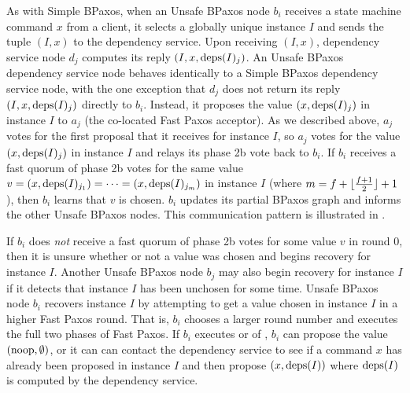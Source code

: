 As with Simple BPaxos, when an Unsafe BPaxos node $b_i$ receives a state
machine command $x$ from a client, it selects a globally unique instance $I$
and sends the tuple $(I, x)$ to the dependency service. Upon receiving $(I,
x)$, dependency service node $d_j$ computes its reply $(I, x, \text{deps}(I)_j)$.  An
Unsafe BPaxos dependency service node behaves identically to a Simple BPaxos
dependency service node, with the one exception that $d_j$ does not return its
reply $(I, x, \text{deps}(I)_j)$ directly to $b_i$. Instead, it proposes the value
$(x, \text{deps}(I)_j)$ in instance $I$ to $a_j$ (the co-located Fast Paxos
acceptor). As we described above, $a_j$ votes for the first proposal that it
receives for instance $I$, so $a_j$ votes for the value $(x, \text{deps}(I)_j)$ in
instance $I$ and relays its phase 2b vote back to $b_i$.
%
If $b_i$ receives a fast quorum of phase 2b votes for the same value $v = (x,
\text{deps}(I)_{j_1}) = \cdots = (x, \text{deps}(I)_{j_m})$ in instance $I$ (where $m =
f + \lfloor\frac{f + 1}{2}\rfloor + 1$), then $b_i$ learns that $v$ is chosen. $b_i$ updates its
partial BPaxos graph and informs the other Unsafe BPaxos nodes. This
communication pattern is illustrated in .

{}
{}

If $b_i$ does \emph{not} receive a fast quorum of phase 2b votes for some value
$v$ in round 0, then it is unsure whether or not a value was chosen and begins
recovery for instance $I$. Another Unsafe BPaxos node $b_j$ may also begin
recovery for instance $I$ if it detects that instance $I$ has been unchosen for
some time.
%
Unsafe BPaxos node $b_i$ recovers instance $I$ by attempting to get a value
chosen in instance $I$ in a higher Fast Paxos round. That is, $b_i$ chooses a
larger round number and executes the full two phases of Fast Paxos. If $b_i$
executes  or  of
, $b_i$ can propose the value $(\text{noop}, \emptyset)$, or it
can can contact the dependency service to see if a command $x$ has already been
proposed in instance $I$ and then propose $(x, \text{deps}(I))$ where $\text{deps}(I)$ is
computed by the dependency service.

